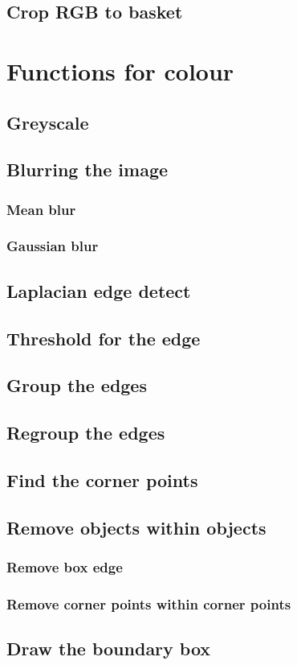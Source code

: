 \documentclass[10pt]{article}
\begin{document}
\subsection{Crop RGB to basket}


\section{Functions for colour}
\subsection{Greyscale}

\subsection{Blurring the image}
\subsubsection{Mean blur}

\subsubsection{Gaussian blur}


\subsection{Laplacian edge detect}

\subsection{Threshold for the edge}

\subsection{Group the edges}

\subsection{Regroup the edges}

\subsection{Find the corner points}

\subsection{Remove objects within objects}
\subsubsection{Remove box edge}

\subsubsection{Remove corner points within corner points}

\subsection{Draw the boundary box}

\end{document}
